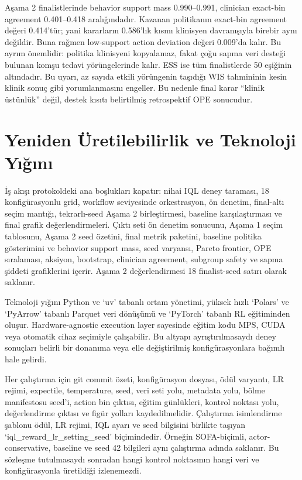 \documentclass[conference]{IEEEtran}
\begin{document}
Aşama 2 finalistlerinde behavior support mass 0.990--0.991, clinician exact-bin agreement 0.401--0.418 aralığındadır. Kazanan politikanın exact-bin agreement değeri 0.414'tür; yani kararların 0.586'lık kısmı klinisyen davranışıyla birebir aynı değildir. Buna rağmen low-support action deviation değeri 0.009'da kalır. Bu ayrım önemlidir: politika klinisyeni kopyalamaz, fakat çoğu sapma veri desteği bulunan komşu tedavi yörüngelerinde kalır. ESS ise tüm finalistlerde 50 eşiğinin altındadır. Bu uyarı, az sayıda etkili yörüngenin taşıdığı WIS tahmininin kesin klinik sonuç gibi yorumlanmasını engeller. Bu nedenle final karar ``klinik üstünlük'' değil, destek kısıtı belirtilmiş retrospektif OPE sonucudur.

\section{Yeniden Üretilebilirlik ve Teknoloji Yığını}
İş akışı protokoldeki ana boşlukları kapatır: nihai IQL deney taraması, 18 konfigürasyonlu grid, workflow seviyesinde orkestrasyon, ön denetim, final-altı seçim mantığı, tekrarlı-seed Aşama 2 birleştirmesi, baseline karşılaştırması ve final grafik değerlendirmeleri. Çıktı seti ön denetim sonucunu, Aşama 1 seçim tablosunu, Aşama 2 seed özetini, final metrik paketini, baseline politika gösterimini ve behavior support mass, seed varyansı, Pareto frontier, OPE sıralaması, aksiyon, bootstrap, clinician agreement, subgroup safety ve sapma şiddeti grafiklerini içerir. Aşama 2 değerlendirmesi 18 finalist-seed satırı olarak saklanır.

Teknoloji yığını Python ve `uv' tabanlı ortam yönetimi, yüksek hızlı `Polars' ve `PyArrow' tabanlı Parquet veri dönüşümü ve `PyTorch' tabanlı RL eğitiminden oluşur. Hardware-agnostic execution layer sayesinde eğitim kodu MPS, CUDA veya otomatik cihaz seçimiyle çalışabilir. Bu altyapı ayrıştırılmasaydı deney sonuçları belirli bir donanıma veya elle değiştirilmiş konfigürasyonlara bağımlı hale gelirdi.

Her çalıştırma için git commit özeti, konfigürasyon dosyası, ödül varyantı, LR rejimi, expectile, temperature, seed, veri seti yolu, metadata yolu, bölme manifestosu seed'i, action bin çıktısı, eğitim günlükleri, kontrol noktası yolu, değerlendirme çıktısı ve figür yolları kaydedilmelidir. Çalıştırma isimlendirme şablonu ödül, LR rejimi, IQL ayarı ve seed bilgisini birlikte taşıyan `iql\_reward\_lr\_setting\_seed' biçimindedir. Örneğin SOFA-biçimli, actor-conservative, baseline ve seed 42 bilgileri aynı çalıştırma adında saklanır. Bu sözleşme tutulmasaydı sonradan hangi kontrol noktasının hangi veri ve konfigürasyonla üretildiği izlenemezdi.
\end{document}
